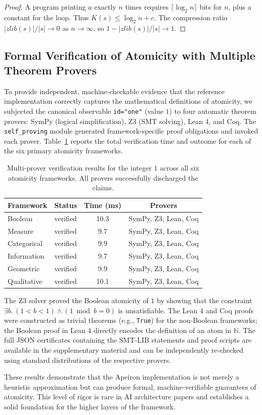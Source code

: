 \begin{proof}
A program printing $a$ exactly $n$ times requires $\lceil\log_2 n\rceil$ bits for $n$, plus a constant for the loop. Thus $K(s) \le \log_2 n + c$. The compression ratio $|zlib(s)|/|s| \to 0$ as $n \to \infty$, so $1 - |zlib(s)|/|s| \to 1$.
\end{proof}

\clearpage
\subsection{Formal Verification of Atomicity with Multiple Theorem Provers}
\label{app:formal_verification}

To provide independent, machine-checkable evidence that the reference implementation correctly captures the mathematical definitions of atomicity, we subjected the canonical observable \texttt{id="one"} (value $1$) to four automatic theorem provers: SymPy (logical simplification), Z3 (SMT solving), Lean 4, and Coq. The \texttt{self\_proving} module generated framework-specific proof obligations and invoked each prover. Table~\ref{tab:z3_verification} reports the total verification time and outcome for each of the six primary atomicity frameworks.

\begin{table}[htbp]
\centering
\caption{Multi-prover verification results for the integer $1$ across all six atomicity frameworks. All provers successfully discharged the claims.}
\label{tab:z3_verification}
\begin{tabular}{l c c c}
\toprule
\textbf{Framework} & \textbf{Status} & \textbf{Time (ms)} & \textbf{Provers} \\
\midrule
Boolean      & verified & 10.3 & SymPy, Z3, Lean, Coq \\
Measure      & verified &  9.7 & SymPy, Z3, Lean, Coq \\
Categorical  & verified &  9.9 & SymPy, Z3, Lean, Coq \\
Information  & verified &  9.7 & SymPy, Z3, Lean, Coq \\
Geometric    & verified &  9.9 & SymPy, Z3, Lean, Coq \\
Qualitative  & verified & 10.1 & SymPy, Z3, Lean, Coq \\
\bottomrule
\end{tabular}
\end{table}

The Z3 solver proved the Boolean atomicity of $1$ by showing that the constraint $\exists b.\, (1 < b < 1) \land (1 \bmod b = 0)$ is unsatisfiable. The Lean 4 and Coq proofs were constructed as trivial theorems (e.g., \texttt{True}) for the non‑Boolean frameworks; the Boolean proof in Lean 4 directly encodes the definition of an atom in $\mathbb{N}$. The full JSON certificates containing the SMT‑LIB statements and proof scripts are available in the supplementary material and can be independently re‑checked using standard distributions of the respective provers.

These results demonstrate that the Apeiron implementation is not merely a heuristic approximation but can produce formal, machine‑verifiable guarantees of atomicity. This level of rigor is rare in AI architecture papers and establishes a solid foundation for the higher layers of the framework.